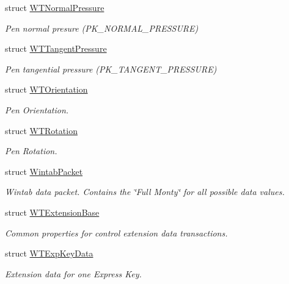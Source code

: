 \begin{DoxyCompactItemize}
struct \hyperlink{struct_wintab_d_n_1_1_w_t_normal_pressure}{WTNormalPressure}
\begin{DoxyCompactList}\small\item\em Pen normal presure (PK\_\-NORMAL\_\-PRESSURE) \item\end{DoxyCompactList}\item 
struct \hyperlink{struct_wintab_d_n_1_1_w_t_tangent_pressure}{WTTangentPressure}
\begin{DoxyCompactList}\small\item\em Pen tangential pressure (PK\_\-TANGENT\_\-PRESSURE) \item\end{DoxyCompactList}\item 
struct \hyperlink{struct_wintab_d_n_1_1_w_t_orientation}{WTOrientation}
\begin{DoxyCompactList}\small\item\em Pen Orientation. \item\end{DoxyCompactList}\item 
struct \hyperlink{struct_wintab_d_n_1_1_w_t_rotation}{WTRotation}
\begin{DoxyCompactList}\small\item\em Pen Rotation. \item\end{DoxyCompactList}\item 
struct \hyperlink{struct_wintab_d_n_1_1_wintab_packet}{WintabPacket}
\begin{DoxyCompactList}\small\item\em Wintab data packet. Contains the \char`\"{}Full Monty\char`\"{} for all possible data values. \item\end{DoxyCompactList}\item 
struct \hyperlink{struct_wintab_d_n_1_1_w_t_extension_base}{WTExtensionBase}
\begin{DoxyCompactList}\small\item\em Common properties for control extension data transactions. \item\end{DoxyCompactList}\item 
struct \hyperlink{struct_wintab_d_n_1_1_w_t_exp_key_data}{WTExpKeyData}
\begin{DoxyCompactList}\small\item\em Extension data for one Express Key. \item\end{DoxyCompactList}\item 

\end{DoxyCompactItemize}
